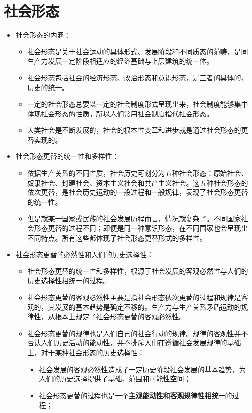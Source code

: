 \documentclass[12pt,openany]{ctexbook}
\newcommand{\zhemph}[1]{{\kaishu #1}}
\begin{document}
\section{社会形态}
\begin{itemize}
  \item 社会形态的内涵：
\begin{itemize}
  \item 社会形态是关于社会运动的具体形式、发展阶段和不同质态的范畴，是同生产力发展一定阶段相适应的经济基础与上层建筑的统一体。
  \item 社会形态包括社会的\zhemph{经济形态、政治形态和意识形态}，是三者的具体的、历史的统一。
  \item 一定的社会形态总要以一定的社会制度形式呈现出来，社会制度能够集中体现社会形态的性质，所以人们常用社会制度指代社会形态。
  \item 人类社会是不断发展的，社会的根本性变革和进步就是通过社会形态的更替实现的。
\end{itemize}
  \item 社会形态更替的统一性和多样性：
\begin{itemize}
  \item 依据生产关系的不同性质，社会历史可划分为五种社会形态：原始社会、奴隶社会、封建社会、资本主义社会和共产主义社会。这五种社会形态的依次更替，是社会历史运动的一般过程和一般规律，表现了社会形态更替的统一性。
  \item 但是就某一国家或民族的社会发展历程而言，情况就复杂了。不同国家社会形态更替的过程不同；即便是同一种意识形态，在不同国家也会呈现出不同特点。所有这些都体现了社会形态更替形式的多样性。
\end{itemize}
  \item 社会形态更替的必然性和人们的历史选择性：
\begin{itemize}
  \item 社会形态更替的统一性和多样性，根源于社会发展的客观必然性与人们的历史选择性相统一的过程。
  \item 社会形态更替的客观必然性主要是指社会形态依次更替的过程和规律是客观的，其发展的基本趋势是确定不移的。生产力与生产关系矛盾运动的规律性，从根本上规定了社会形态更替的客观必然性。
  \item 社会形态更替的规律也是人们自己的社会行动的规律。规律的客观性并不否认人们历史活动的能动性，并不排斥人们在遵循社会发展规律的基础上，对于某种社会形态的历史选择性：
\begin{itemize}
  \item 社会发展的客观必然性造成了一定历史阶段社会发展的基本趋势，为人们的历史选择提供了基础、范围和可能性空间；
  \item 社会形态更替的过程也是一个\textbf{主观能动性和客观规律性相统一}的过程；

\end{itemize}
\end{itemize}
\end{itemize}
\end{document}
